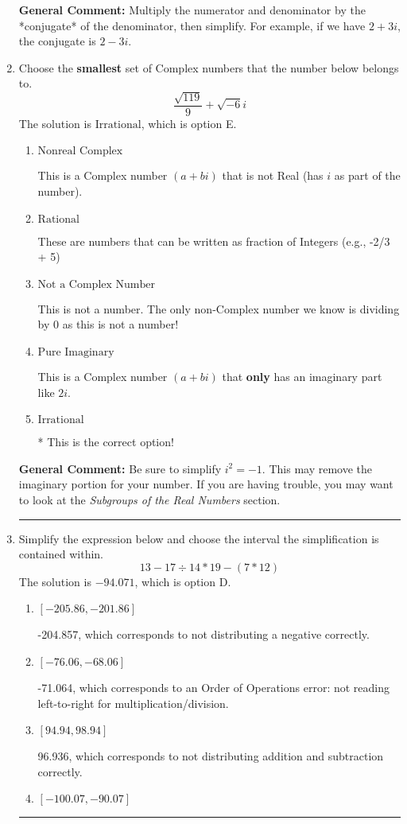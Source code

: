 \documentclass{extbook}[14pt]
\newcommand{\litem}[1]{\item #1

\rule{\textwidth}{0.4pt}}
\begin{document}
\begin{enumerate}
{\textbf{General Comment:} Multiply the numerator and denominator by the *conjugate* of the denominator, then simplify. For example, if we have $2+3i$, the conjugate is $2-3i$.
}
\litem{
Choose the \textbf{smallest} set of Complex numbers that the number below belongs to.
\[ \frac{\sqrt{119}}{9}+\sqrt{-6}i \]The solution is \( \text{Irrational} \), which is option E.\begin{enumerate}[label=\Alph*.]
\item \( \text{Nonreal Complex} \)

This is a Complex number $(a+bi)$ that is not Real (has $i$ as part of the number).
\item \( \text{Rational} \)

These are numbers that can be written as fraction of Integers (e.g., -2/3 + 5)
\item \( \text{Not a Complex Number} \)

This is not a number. The only non-Complex number we know is dividing by 0 as this is not a number!
\item \( \text{Pure Imaginary} \)

This is a Complex number $(a+bi)$ that \textbf{only} has an imaginary part like $2i$.
\item \( \text{Irrational} \)

* This is the correct option!
\end{enumerate}

\textbf{General Comment:} Be sure to simplify $i^2 = -1$. This may remove the imaginary portion for your number. If you are having trouble, you may want to look at the \textit{Subgroups of the Real Numbers} section.
}
\litem{
Simplify the expression below and choose the interval the simplification is contained within.
\[ 13 - 17 \div 14 * 19 - (7 * 12) \]The solution is \( -94.071 \), which is option D.\begin{enumerate}[label=\Alph*.]
\item \( [-205.86, -201.86] \)

 -204.857, which corresponds to not distributing a negative correctly.
\item \( [-76.06, -68.06] \)

 -71.064, which corresponds to an Order of Operations error: not reading left-to-right for multiplication/division.
\item \( [94.94, 98.94] \)

 96.936, which corresponds to not distributing addition and subtraction correctly.
\item \( [-100.07, -90.07] \)


\end{enumerate}}
\end{enumerate}
\end{document}
